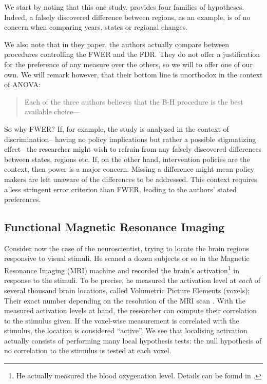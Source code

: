 \documentclass[review,12pt]{article}
\begin{document}
We start by noting that this one study, provides four families of hypotheses. Indeed, a falsely discovered difference between regions, as an example, is of no concern when comparing years, states or regional changes.

We also note that in they paper, the authors actually compare between procedures controlling the FWER and the FDR. They do not offer a justification for the preference of any measure over the others, so we will to offer one of our own. We will remark however, that their bottom line is unorthodox in the context of ANOVA: 
\begin{quote}
Each of the three authors believes that the B-H procedure is the best available choice--- \citeauthor*{williams_controlling_1999}
\end{quote}

So why FWER? If, for example, the study is analyzed in the context of discrimination-- having no policy implications but rather a possible stigmatizing effect-- the researcher might wish to refrain from any falsely discovered differences between states, regions etc. If, on the other hand, intervention policies are the context, then power is a major concern. Missing a difference might mean policy makers are left unaware of the differences to be addressed. This context requires a less stringent error criterion than FWER, leading to the authors' stated preferences.





\subsection{\label{sub:fMRI}Functional Magnetic Resonance Imaging}

Consider now the case of the neuroscientist, trying to locate the brain regions responsive to visual stimuli. He scaned a dozen subjects or so in the Magnetic Resonance Imaging (MRI) machine and recorded the brain's activation\footnote{ He actually measured the blood oxygenation level. Details can be found in \cite{lazar_statistical_2008}.} in response to the stimuli. To be precise, he measured the activation level at \emph{each} of several thousand brain locations, called Volumetric Picture Elements (voxels); Their exact number depending on the resolution of the MRI scan . With the measured activation levels at hand, the researcher can compute their correlation to the stimulus given. If the voxel-wise measurement is correlated with the stimulus, the location is considered ``active''. We see that localising activation actually consists of performing many local hypothesis tests: the null hypothesis of no correlation to the stimulus is tested at each voxel.
\end{document}
